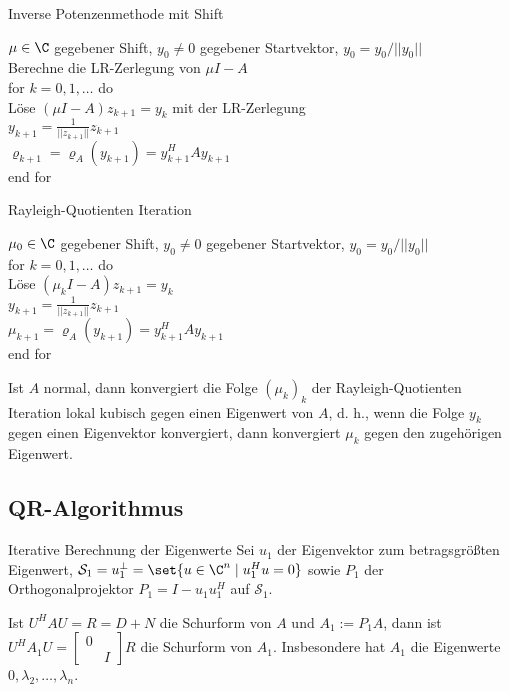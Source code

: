 \begin{karte}{Inverse Potenzenmethode mit Shift}
    \begin{tabbing}
        \( \mu \in \C \) gegebener Shift, \(y_0 \neq 0\) gegebener Startvektor, \(y_0 = y_0 / ||y_0||\) \\
        Berechne die LR-Zerlegung von \( \mu I - A \)\\
        for \= \( k = 0,1,\ldots \) do \\
        \> Löse \( (\mu I - A) z_{k+1} = y_k \) mit der LR-Zerlegung \\
        \> \( y_{k+1} = \frac{1}{||z_{k+1}||} z_{k+1}\) \\
        \> \( \varrho_{k+1} = \varrho_A(y_{k+1}) = y_{k+1}^H A y_{k+1} \) \\
        end for
    \end{tabbing}
\end{karte}

\begin{karte}{Rayleigh-Quotienten Iteration}
    \begin{tabbing}
        \( \mu_0 \in \C \) gegebener Shift, \(y_0 \neq 0\) gegebener Startvektor, \(y_0 = y_0 / ||y_0||\) \\
        for \= \( k = 0,1,\ldots \) do \\
        \> Löse \( (\mu_k I - A) z_{k+1} = y_k \) \\
        \> \( y_{k+1} = \frac{1}{||z_{k+1}||} z_{k+1}\) \\
        \> \( \mu_{k+1} = \varrho_A(y_{k+1}) = y_{k+1}^H A y_{k+1} \) \\
        end for
    \end{tabbing}
    
    Ist \(A\) normal, dann konvergiert die Folge \( (\mu_k)_k \) der Rayleigh-Quotienten Iteration 
    lokal kubisch gegen einen Eigenwert von \(A\), d. h., wenn die Folge \(y_k\) gegen einen Eigenvektor 
    konvergiert, dann konvergiert \(\mu_k\) gegen den zugehörigen Eigenwert.
\end{karte}

\subsection{QR-Algorithmus}

\begin{karte}{Iterative Berechnung der Eigenwerte}
    Sei \( u_1 \) der Eigenvektor zum betragsgrößten Eigenwert, 
    \( \mathcal{S}_1 = u_1^\bot = \set{u \in \C^n \;|\; u_1^H u = 0} \)
    sowie \( P_1 \) der Orthogonalprojektor \( P_1 = I - u_1 u_1^H \) auf \( \mathcal{S}_1 \).
    
    Ist \( U^H A U = R = D + N \) die Schurform von \(A\) und \( A_1 := P_1 A \), 
    dann ist \( U^H A_1 U =\left[ \begin{matrix}
        0 & \\
        & I
    \end{matrix}\right] R \) die Schurform von \(A_1\). 
    Insbesondere hat \( A_1 \) die Eigenwerte \( 0, \lambda_2,\ldots, \lambda_n \).
\end{karte}

